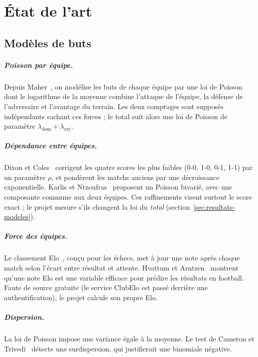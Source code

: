 
\chapter{État de l'art}
\label{chap:etat-art}

\section{Modèles de buts}

\paragraph{Poisson par équipe.} Depuis Maher~\cite{maher1982}, on modélise les buts de chaque équipe
par une loi de Poisson dont le logarithme de la moyenne combine l'attaque de l'équipe, la défense de
l'adversaire et l'avantage du terrain. Les deux comptages sont supposés indépendants sachant ces
forces ; le total suit alors une loi de Poisson de paramètre \(\lambda_{\mathrm{dom}} +
\lambda_{\mathrm{ext}}\).

\paragraph{Dépendance entre équipes.} Dixon et Coles~\cite{dixon1997} corrigent les quatre scores les
plus faibles (0-0, 1-0, 0-1, 1-1) par un paramètre \(\rho\), et pondèrent les matchs anciens par une
décroissance exponentielle. Karlis et Ntzoufras~\cite{karlis2003} proposent un Poisson bivarié, avec
une composante commune aux deux équipes. Ces raffinements visent surtout le score exact ; le projet
mesure s'ils changent la loi du \emph{total} (section~\ref{sec:resultats-modeles}).

\paragraph{Force des équipes.} Le classement Elo~\cite{elo1978}, conçu pour les échecs, met à jour une
note après chaque match selon l'écart entre résultat et attente. Hvattum et Arntzen~\cite{hvattum2010}
montrent qu'une note Elo est une variable efficace pour prédire les résultats en football. Faute de
source gratuite (le service ClubElo est passé derrière une authentification), le projet calcule son
propre Elo.

\paragraph{Dispersion.} La loi de Poisson impose une variance égale à la moyenne. Le test de Cameron
et Trivedi~\cite{cameron1990} détecte une surdispersion, qui justifierait une binomiale négative.

